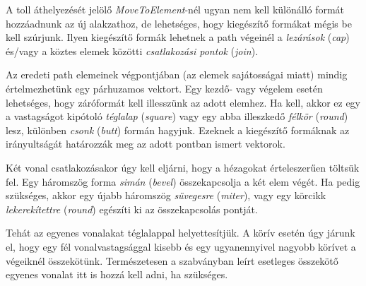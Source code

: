 \documentclass[12pt]{report}
\theoremstyle{definition}
\newcommand{\inenglish}[1]{\textsl{#1}}
\newcommand{\func}[1]{{\textsl{#1}}}
\begin{document}
A toll áthelyezését jelölő \func{MoveToElement}-nél ugyan nem kell különálló
formát hozzáadnunk az új alakzathoz, de lehetséges, hogy kiegészítő formákat
mégis be kell szúrjunk. Ilyen kiegészítő formák lehetnek a path végeinél a
\emph{lezárások} (\inenglish{cap}) és/vagy a köztes elemek közötti
\emph{csatlakozási pontok} (\inenglish{join}).

Az eredeti path elemeinek végpontjában (az elemek sajátosságai miatt) mindig
értelmezhetünk egy párhuzamos vektort. Egy kezdő- vagy végelem esetén
lehetséges, hogy záróformát kell illesszünk az adott elemhez. Ha kell, akkor ez
egy a vastagságot kipótoló \emph{téglalap} (\inenglish{square}) vagy egy abba
illeszkedő \emph{félkör} (\inenglish{round}) lesz, különben \emph{csonk}
(\inenglish{butt}) formán hagyjuk. Ezeknek a kiegészítő formáknak az
irányultságát határozzák meg az adott pontban ismert vektorok.

Két vonal csatlakozásakor úgy kell eljárni, hogy a hézagokat érteleszerűen
töltsük fel. Egy háromszög forma \emph{simán} (\inenglish{bevel})
összekapcsolja a két elem végét. Ha pedig szükséges, akkor egy újabb háromszög
\emph{süvegesre} (\inenglish{miter}), vagy egy körcikk \emph{lekerekítettre}
(\inenglish{round}) egészíti ki az összekapcsolás pontját.

Tehát az egyenes vonalakat téglalappal helyettesítjük. A körív esetén úgy
járunk el, hogy egy fél vonalvastagsággal kisebb és egy ugyanennyivel nagyobb
körívet a végeiknél összekötünk. Természetesen a szabványban leírt esetleges
összekötő egyenes vonalat itt is hozzá kell adni, ha szükséges.
\end{document}
